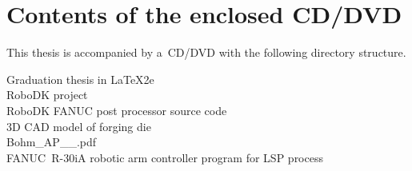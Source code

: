 ﻿\chapter{Contents of the enclosed CD/DVD \label{ch:ApendCD}}

This thesis is accompanied by a~CD/DVD with the following directory structure.

\begin{description}

    \item[Graduation thesis in \LaTeX2e] 
            
    \item[RoboDK project] 

    \item[RoboDK FANUC post processor source code] 

    \item[3D CAD model of forging die] 

    \item[Bohm\_AP\_\the\value{YearOld}\_\Year.pdf] 
     
     \item[FANUC~R-30iA robotic arm controller program for LSP process]

\end{description}

